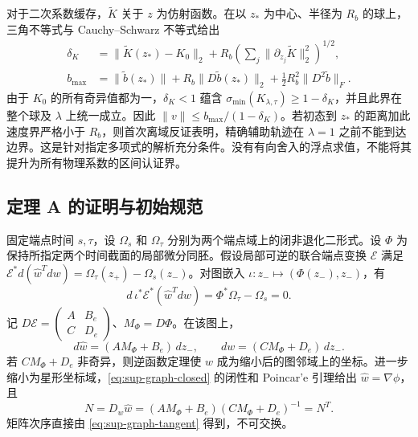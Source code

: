 对于二次系数缓存，$\widetilde K$ 关于 $z$ 为仿射函数。在以 $z_*$ 为中心、半径为 $R_b$ 的球上，三角不等式与 Cauchy--Schwarz 不等式给出
\begin{align}
 \delta_K&=\|\widetilde K(z_*)-K_0\|_2
       +R_b\left(\sum_j\|\partial_{z_j}\widetilde K\|_2^2\right)^{1/2},\\
 b_{\max}&=\|\widetilde b(z_*)\|+R_b\|D\widetilde b(z_*)\|_2
                          +\tfrac12R_b^2\|D^2\widetilde b\|_F.
 \label{eq:sup-ball-bounds}
\end{align}
由于 $K_0$ 的所有奇异值都为一，$\delta_K<1$ 蕴含 $\sigma_{\min}(K_{\lambda,\tau})\ge1-\delta_K$，并且此界在整个球及 $\lambda$ 上统一成立。因此 $\|v\|\le b_{\max}/(1-\delta_K)$。若初态到 $z_*$ 的距离加此速度界严格小于 $R_b$，则首次离域反证表明，精确辅助轨迹在 $\lambda=1$ 之前不能到达边界。这是针对指定多项式的解析充分条件。没有有向舍入的浮点求值，不能将其提升为所有物理系数的区间认证界。

\subsection{定理 A 的证明与初始规范}
固定端点时间 $s,\tau$，设 $\Omega_s$ 和 $\Omega_\tau$ 分别为两个端点域上的闭非退化二形式。设 $\Phi$ 为保持所指定两个时间截面的局部微分同胚。假设局部可逆的联合端点变换 $\mathcal E$ 满足
$\mathcal E^*d(\widehat w^Tdw)=\Omega_\tau(z_+)-\Omega_s(z_-)$。对图嵌入 $\iota:z_-\mapsto(\Phi(z_-),z_-)$，有
\begin{equation}
 d\,\iota^*\mathcal E^*(\widehat w^Tdw)=\Phi^*\Omega_\tau-\Omega_s=0.
 \label{eq:sup-graph-closed}
\end{equation}
记 $D\mathcal E=\left(\begin{smallmatrix}A&B_e\\C&D_e\end{smallmatrix}\right)$、$M_\Phi=D\Phi$。在该图上，
\begin{equation}
 d\widehat w=(AM_\Phi+B_e)\,dz_-,\qquad
 dw=(CM_\Phi+D_e)\,dz_-.
 \label{eq:sup-graph-tangent}
\end{equation}
若 $CM_\Phi+D_e$ 非奇异，则逆函数定理使 $w$ 成为缩小后的图邻域上的坐标。进一步缩小为星形坐标域，\eqref{eq:sup-graph-closed} 的闭性和 Poincar'e 引理给出 $\widehat w=\nabla\phi$，且
\begin{equation}
 N=D_w\widehat w=(AM_\Phi+B_e)(CM_\Phi+D_e)^{-1}=N^T.
 \label{eq:sup-hessian}
\end{equation}
矩阵次序直接由 \eqref{eq:sup-graph-tangent} 得到，不可交换。

